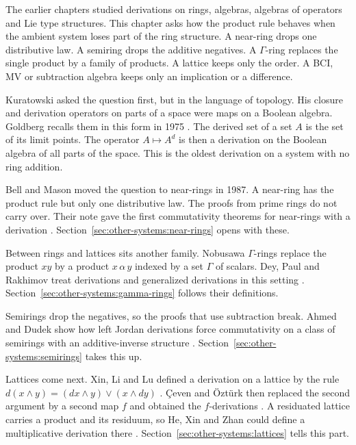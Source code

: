 
The earlier chapters studied derivations on rings, algebras, algebras of
operators and Lie type structures. This chapter asks how the product rule
behaves when the ambient system loses part of the ring structure. A
near-ring drops one distributive law. A semiring drops the additive
negatives. A $\Gamma$-ring replaces the single product by a family of
products. A lattice keeps only the order. A BCI, MV or subtraction algebra
keeps only an implication or a difference.


Kuratowski asked the question first, but in the language of topology. His
closure and derivation operators on parts of a space were maps on a
Boolean algebra. Goldberg recalls them in this form in 1975
\cite[p.~365]{Goldberg1975}. The derived set of a set $A$ is the set of
its limit points. The operator $A \mapsto A^{d}$ is then a derivation on
the Boolean algebra of all parts of the space. This is the oldest
derivation on a system with no ring addition.

Bell and Mason moved the question to near-rings in 1987. A near-ring has
the product rule but only one distributive law. The proofs from prime
rings do not carry over. Their note gave the first commutativity theorems
for near-rings with a derivation
\cite[pp.~31--33]{BellMason1987}. Section~\ref{sec:other-systems:near-rings}
opens with these.

Between rings and lattices sits another family. Nobusawa $\Gamma$-rings
replace the product $xy$ by a product $x\, \alpha\, y$ indexed by a set
$\Gamma$ of scalars. Dey, Paul and Rakhimov treat derivations and
generalized derivations in this setting
\cite[pp.~2--3]{DeyPaulRakhimov2012}.
Section~\ref{sec:other-systems:gamma-rings} follows their definitions.

Semirings drop the negatives, so the proofs that use subtraction break. Ahmed
and Dudek show how left Jordan derivations force commutativity on a class
of semirings with an additive-inverse structure
\cite[pp.~624--631]{AhmedDudek2021}.
Section~\ref{sec:other-systems:semirings} takes this up.

Lattices come next. Xin, Li and Lu defined a derivation on a lattice by
the rule $d(x \wedge y) = (dx \wedge y) \vee (x \wedge dy)$
\cite[Definition~3.1, p.~309]{XinLiLu2008}. {\c{C}}even and {\"O}zt{\"u}rk
then replaced the second argument by a second map $f$ and obtained the
$f$-derivations \cite[Definition~8, p.~702]{CevenOzturk2008}. A residuated
lattice carries a product and its residuum, so He, Xin and Zhan could
define a multiplicative derivation there
\cite[Definition~3.1, p.~100]{HeXinZhan2016}.
Section~\ref{sec:other-systems:lattices} tells this part.


